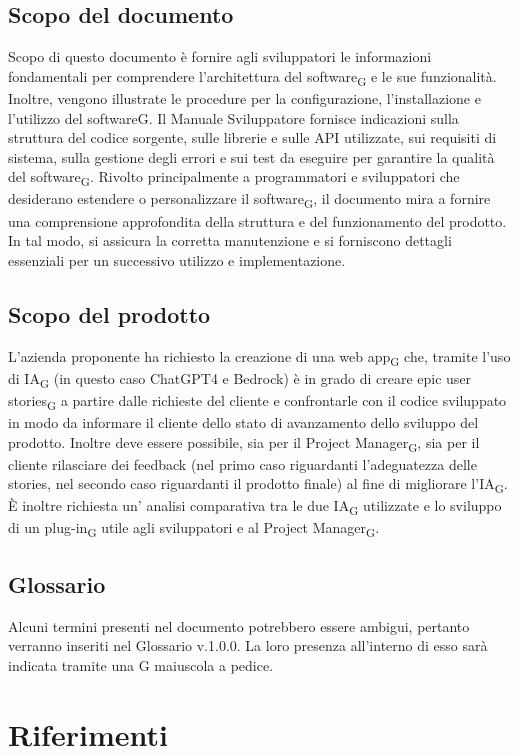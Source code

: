 \documentclass{article}
\begin{document}
{\subsection{Scopo del documento}
Scopo di questo documento è fornire agli sviluppatori le informazioni fondamentali per comprendere l'architettura del software\textsubscript{G} e le sue funzionalità. Inoltre, vengono illustrate le procedure per la configurazione, l'installazione e l'utilizzo del software\textsc{G}. Il Manuale Sviluppatore fornisce indicazioni sulla struttura del codice sorgente, sulle librerie e sulle API utilizzate, sui requisiti di sistema, sulla gestione degli errori e sui test da eseguire per garantire la qualità del software\textsubscript{G}. Rivolto principalmente a programmatori e sviluppatori che desiderano estendere o personalizzare il software\textsubscript{G}, il documento mira a fornire una comprensione approfondita della struttura e del funzionamento del prodotto. In tal modo, si assicura la corretta manutenzione e si forniscono dettagli essenziali per un successivo utilizzo e implementazione.
\subsection{Scopo del prodotto}
L'azienda proponente ha richiesto la creazione di una web app\textsubscript{G} che, tramite l'uso di IA\textsubscript{G} (in questo caso ChatGPT4 e Bedrock) è in grado di creare epic user stories\textsubscript{G} a partire dalle richieste del cliente e confrontarle con il codice sviluppato in modo da informare il cliente dello stato di avanzamento dello sviluppo del prodotto. Inoltre deve essere possibile, sia per il Project Manager\textsubscript{G}, sia per il cliente rilasciare dei feedback (nel primo caso riguardanti l'adeguatezza delle stories, nel secondo caso riguardanti il prodotto finale) al fine di migliorare l'IA\textsubscript{G}. È inoltre richiesta un' analisi comparativa tra le due IA\textsubscript{G} utilizzate e lo sviluppo di un plug-in\textsubscript{G} utile agli sviluppatori e al Project Manager\textsubscript{G}.

\subsection{Glossario}
Alcuni termini presenti nel documento potrebbero essere ambigui, pertanto verranno inseriti nel Glossario v.1.0.0. La loro presenza all'interno di esso sarà indicata tramite una G maiuscola a pedice. 

\section{Riferimenti}
}
\end{document}
